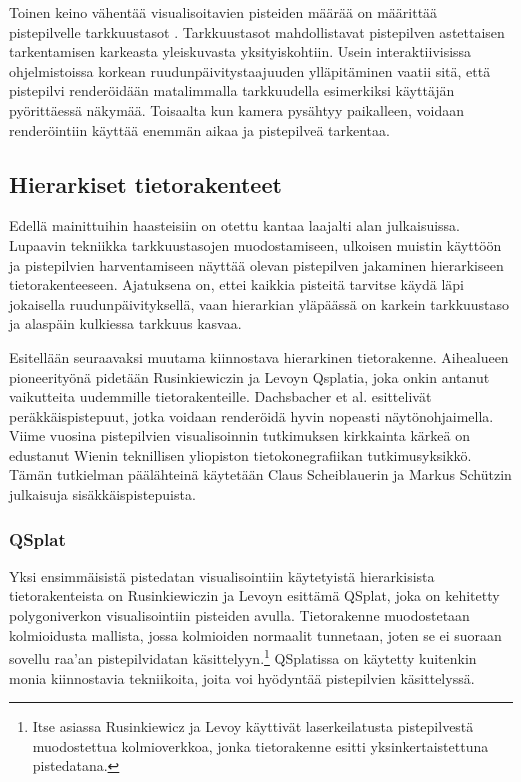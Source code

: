 Toinen keino vähentää visualisoitavien pisteiden määrää on määrittää pistepilvelle tarkkuustasot . Tarkkuustasot mahdollistavat pistepilven astettaisen tarkentamisen karkeasta yleiskuvasta yksityiskohtiin. Usein interaktiivisissa ohjelmistoissa korkean ruudunpäivitystaajuuden ylläpitäminen vaatii sitä, että pistepilvi renderöidään matalimmalla tarkkuudella esimerkiksi käyttäjän pyörittäessä näkymää. Toisaalta kun kamera pysähtyy paikalleen, voidaan renderöintiin käyttää enemmän aikaa ja pistepilveä tarkentaa.

\subsection{Hierarkiset tietorakenteet}\label{tietorakenteet}

Edellä mainittuihin haasteisiin on otettu kantaa laajalti alan julkaisuissa. Lupaavin tekniikka tarkkuustasojen muodostamiseen, ulkoisen muistin käyttöön ja pistepilvien harventamiseen näyttää olevan pistepilven jakaminen hierarkiseen tietorakenteeseen. Ajatuksena on, ettei kaikkia pisteitä tarvitse käydä läpi jokaisella ruudunpäivityksellä, vaan hierarkian yläpäässä on karkein tarkkuustaso ja alaspäin kulkiessa tarkkuus kasvaa.  

Esitellään seuraavaksi muutama kiinnostava hierarkinen tietorakenne. Aihealueen pioneerityönä pidetään Rusinkiewiczin ja Levoyn Qsplatia, joka onkin antanut vaikutteita uudemmille tietorakenteille. Dachsbacher et al. esittelivät peräkkäispistepuut, jotka voidaan renderöidä hyvin nopeasti näytönohjaimella. Viime vuosina pistepilvien visualisoinnin tutkimuksen kirkkainta kärkeä on edustanut Wienin teknillisen yliopiston tietokonegrafiikan tutkimusyksikkö. Tämän tutkielman päälähteinä käytetään Claus Scheiblauerin ja Markus Schützin julkaisuja sisäkkäispistepuista.

\subsubsection{QSplat}
Yksi ensimmäisistä pistedatan visualisointiin käytetyistä hierarkisista tietorakenteista on Rusinkiewiczin ja Levoyn esittämä QSplat, joka on kehitetty polygoniverkon visualisointiin pisteiden avulla. Tietorakenne muodostetaan kolmioidusta mallista, jossa kolmioiden normaalit tunnetaan, joten se ei suoraan sovellu raa'an pistepilvidatan käsittelyyn.\footnote{Itse asiassa Rusinkiewicz ja Levoy käyttivät laserkeilatusta pistepilvestä muodostettua kolmioverkkoa, jonka tietorakenne esitti yksinkertaistettuna pistedatana.} QSplatissa on käytetty kuitenkin monia kiinnostavia tekniikoita, joita voi hyödyntää pistepilvien käsittelyssä. \cite{qsplat}

